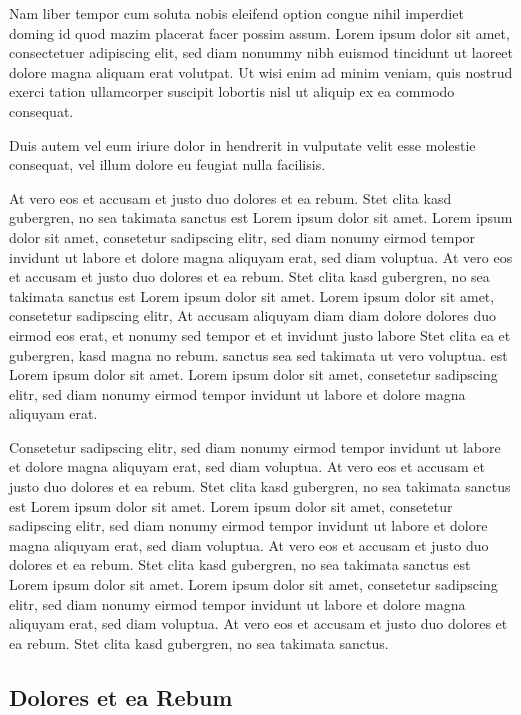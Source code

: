 \documentclass[]{../thesis}
\begin{document}
    
    Nam liber tempor cum soluta nobis eleifend option congue nihil imperdiet doming id quod mazim placerat facer possim assum. Lorem ipsum dolor sit amet, consectetuer adipiscing elit, sed diam nonummy nibh euismod tincidunt ut laoreet dolore magna aliquam erat volutpat. Ut wisi enim ad minim veniam, quis nostrud exerci tation ullamcorper suscipit lobortis nisl ut aliquip ex ea commodo consequat.   
    
    Duis autem vel eum iriure dolor in hendrerit in vulputate velit esse molestie consequat, vel illum dolore eu feugiat nulla facilisis.   
    
    At vero eos et accusam et justo duo dolores et ea rebum. Stet clita kasd gubergren, no sea takimata sanctus est Lorem ipsum dolor sit amet. Lorem ipsum dolor sit amet, consetetur sadipscing elitr, sed diam nonumy eirmod tempor invidunt ut labore et dolore magna aliquyam erat, sed diam voluptua. At vero eos et accusam et justo duo dolores et ea rebum. Stet clita kasd gubergren, no sea takimata sanctus est Lorem ipsum dolor sit amet. Lorem ipsum dolor sit amet, consetetur sadipscing elitr, At accusam aliquyam diam diam dolore dolores duo eirmod eos erat, et nonumy sed tempor et et invidunt justo labore Stet clita ea et gubergren, kasd magna no rebum. sanctus sea sed takimata ut vero voluptua. est Lorem ipsum dolor sit amet. Lorem ipsum dolor sit amet, consetetur sadipscing elitr, sed diam nonumy eirmod tempor invidunt ut labore et dolore magna aliquyam erat.   
    
    Consetetur sadipscing elitr, sed diam nonumy eirmod tempor invidunt ut labore et dolore magna aliquyam erat, sed diam voluptua. At vero eos et accusam et justo duo dolores et ea rebum. Stet clita kasd gubergren, no sea takimata sanctus est Lorem ipsum dolor sit amet. Lorem ipsum dolor sit amet, consetetur sadipscing elitr, sed diam nonumy eirmod tempor invidunt ut labore et dolore magna aliquyam erat, sed diam voluptua. At vero eos et accusam et justo duo dolores et ea rebum. Stet clita kasd gubergren, no sea takimata sanctus est Lorem ipsum dolor sit amet. Lorem ipsum dolor sit amet, consetetur sadipscing elitr, sed diam nonumy eirmod tempor invidunt ut labore et dolore magna aliquyam erat, sed diam voluptua. At vero eos et accusam et justo duo dolores et ea rebum. Stet clita kasd gubergren, no sea takimata sanctus.   
    
    \subsection{Dolores et ea Rebum}
    
\end{document}
